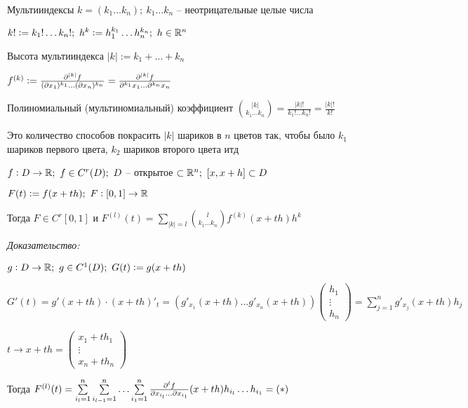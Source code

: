 \documentclass[12pt]{article}
\begin{document}
\begin{defin}{Мультииндексы}
    $k = (k_1 \ldots k_n);\ k_1 \ldots k_n$ -- неотрицательные целые числа 

    $k! := k_1!\ldots k_n!;\ h^k := h_1^{k_1} \ldots h_n^{k_n};\ h \in \mathbb R^n$
\end{defin}

\begin{defin}{Высота мультииндекса}
    $|k| := k_1 + \ldots + k_n$

    $f^{(k)} := \frac{\partial^{|k|}f}{(\partial x_1)^{k_1} \ldots (\partial x_n)^{k_n}} = \frac{\partial ^{|k|}f}{\partial ^{k_1}x_1 \ldots \partial^{k_n}x_n}$
\end{defin}

\begin{defin}{Полиномиальный (мультиномиальный) коэффициент}
    ${|k| \choose k_1 \ldots k_n} = \frac{|k|!}{k_1! \ldots k_n!} = \frac{|k|!}{k!}$

    Это количество способов покрасить $|k|$ шариков в $n$ цветов так, чтобы было $k_1$ шариков первого цвета, $k_2$ шариков второго цвета итд 
\end{defin}

\begin{lem}{}
    $f : D \to \mathbb R;\ f \in C^r(D);\ D$ -- открытое $\subset \mathbb R^n;\ [x, x + h] \subset D$

    $F(t) := f(x + th);\ F : [0, 1] \to \mathbb R$

    Тогда $F \in C^r[0, 1]$ и $F^{(l)}(t) = \sum\limits_{|k| = l}{l \choose k_1 \ldots k_n}f^{(k)}(x + th)h^k$ 
\end{lem}

\newpage 

\textit{Доказательство:}

$g : D \to \mathbb R;\ g \in C^1(D);\ G(t) := g(x + th)$

$G'(t) = g'(x + th) \cdot \left(x + th\right)'_t = \left(g'_{x_1}(x + th) \ldots g'_{x_n}(x + th)\right)\begin{pmatrix}
    h_1 \\
    \vdots \\
    h_n
\end{pmatrix} = \sum\limits_{j = 1}^n g'_{x_j}(x + th)h_j$

$t \to x + th = \begin{pmatrix}
    x_1 + th_1 \\
    \vdots \\
    x_n + th_n
\end{pmatrix}$

Тогда $F^{(l)}(t) = \sum\limits_{i_l = 1}^n \sum\limits_{i_{l - 1} = 1}^n \ldots \sum\limits_{i_1 = 1}^n \frac{\partial ^lf}{\partial x_{i_l} \ldots \partial x_{i_1}}(x + th)h_{i_l} \ldots h_{i_1} = (*)$
\end{document}
